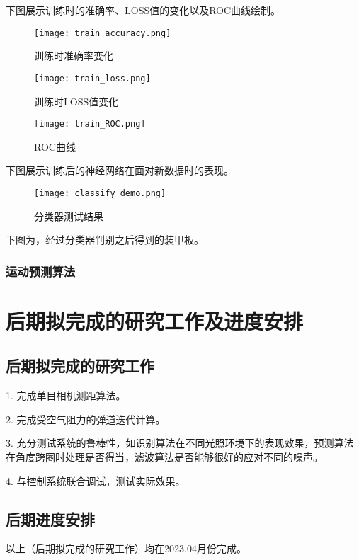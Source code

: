 下图展示训练时的准确率、LOSS值的变化以及ROC曲线绘制。
\begin{figure}[H]
    \centering
    \texttt{[image: train\_accuracy.png]} %
    \caption{训练时准确率变化} %
\end{figure}

\begin{figure}[H]
    \centering
    \texttt{[image: train\_loss.png]} %
    \caption{训练时LOSS值变化} %
\end{figure}

\begin{figure}[H]
    \centering
    \texttt{[image: train\_ROC.png]} %
    \caption{ROC曲线} %
\end{figure}

下图展示训练后的神经网络在面对新数据时的表现。
\begin{figure}[H]
    \centering
    \texttt{[image: classify\_demo.png]} %
    \caption{分类器测试结果} %
\end{figure}

下图为，经过分类器判别之后得到的装甲板。
\subsubsection{运动预测算法}






\section{后期拟完成的研究工作及进度安排}
\subsection{后期拟完成的研究工作}
1. 完成单目相机测距算法。\par
2. 完成受空气阻力的弹道迭代计算。\par
3. 充分测试系统的鲁棒性，如识别算法在不同光照环境下的表现效果，预测算法在角度跨圈时处理是否得当，滤波算法是否能够很好的应对不同的噪声。\par
4. 与控制系统联合调试，测试实际效果。\par
\subsection{后期进度安排}
以上（后期拟完成的研究工作）均在2023.04月份完成。
